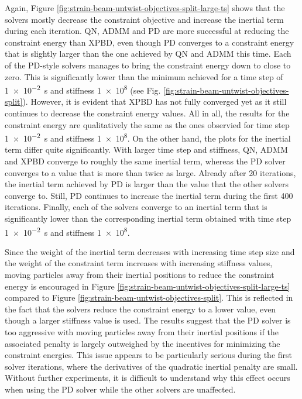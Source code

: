 Again, Figure \ref{fig:strain-beam-untwist-objectives-split-large-ts} shows that the solvers mostly decrease the constraint objective and increase the inertial term during each 
iteration. QN, ADMM and PD are more successful at reducing the constraint energy than XPBD, even 
though PD converges to a constraint energy that is slightly larger than the one achieved by QN and ADMM this time. Each of the PD-style solvers manages to bring the 
constraint energy down to close to zero. This is significantly lower than the minimum achieved for a time step of \SI{1e-2}{\second} and stiffness \num{1e8} (see 
Fig. \ref{fig:strain-beam-untwist-objectives-split}). However, it is evident that XPBD has not fully converged yet as it still continues to decrease the constraint energy 
values. All in all, the results for the constraint energy are qualitatively the same as the ones observied for 
time step \SI{1e-2}{\second} and stiffness \num{1e8}. On the other hand, the plots for the inertial term differ quite significantly. With larger time step and stiffness,
QN, ADMM and XPBD converge to roughly the same inertial term, whereas the PD solver converges to a value that is more than twice as large. Already after 20 iterations, 
the inertial term achieved by PD is larger than the value that the other solvers converge to. Still, PD continues to increase the inertial term during the first 400 
iterations. Finally, each of the solvers converge to an inertial term that is significantly lower than the corresponding inertial term obtained with time step 
\SI{1e-2}{\second} and stiffness \num{1e8}.

Since the weight of the inertial term decreases with increasing time step size and the weight of the constraint term increases with increasing stiffness values, moving 
particles away from their inertial positions to reduce the constraint energy is encouraged in Figure \ref{fig:strain-beam-untwist-objectives-split-large-ts} compared to
Figure \ref{fig:strain-beam-untwist-objectives-split}. This is reflected in the fact that the solvers reduce the constraint energy to a lower value, even though a larger 
stiffness value is used. The results suggest that the PD solver is too aggressive with moving particles away from their inertial positions if the associated penalty 
is largely outweighed by the incentives for minimizing the constraint energies. This issue 
appears to be particularly serious during the first solver iterations, where the derivatives of the quadratic inertial penalty are small. 
Without further experiments, it is difficult to understand why this effect occurs when using the PD solver while the other solvers are unaffected.

